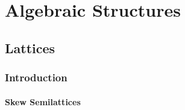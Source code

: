 \documentclass{book}
\begin{document}
	
	
	
	
	
	
	
	
	
	
	
	
	
	
	
	
	
	
	
	
	
	
	
	
	
	
	
	
	
	
	
	
	
	
	
	
	
	
	
	
	
	
	
	
	
	
	
	
	
	
	
	
	
	
	
	
	
	
	
	
	
	
	
	
	
	
	
	
	
	
	
	
	
	\newpage
	
	\part{Algebraic Structures}
	
	\chapter{Lattices}
	
	\section{Introduction}
	
	\subsection{Skew Semilattices}

	
\end{document}
